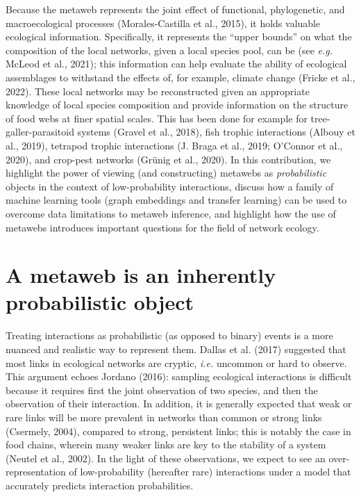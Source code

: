 \documentclass[11pt]{article}
\begin{document}
Because the metaweb represents the joint effect of functional,
phylogenetic, and macroecological processes (Morales-Castilla et al.,
2015), it holds valuable ecological information. Specifically, it
represents the ``upper bounds'' on what the composition of the local
networks, given a local species pool, can be (see \emph{e.g.} McLeod et
al., 2021); this information can help evaluate the ability of ecological
assemblages to withstand the effects of, for example, climate change
(Fricke et al., 2022). These local networks may be reconstructed given
an appropriate knowledge of local species composition and provide
information on the structure of food webs at finer spatial scales. This
has been done for example for tree-galler-parasitoid systems (Gravel et
al., 2018), fish trophic interactions (Albouy et al., 2019), tetrapod
trophic interactions (J. Braga et al., 2019; O'Connor et al., 2020), and
crop-pest networks (Grünig et al., 2020). In this contribution, we
highlight the power of viewing (and constructing) metawebs as
\emph{probabilistic} objects in the context of low-probability
interactions, discuss how a family of machine learning tools (graph
embeddings and transfer learning) can be used to overcome data
limitations to metaweb inference, and highlight how the use of metawebs
introduces important questions for the field of network ecology.

\hypertarget{a-metaweb-is-an-inherently-probabilistic-object}{%
\section{A metaweb is an inherently probabilistic
object}\label{a-metaweb-is-an-inherently-probabilistic-object}}

Treating interactions as probabilistic (as opposed to binary) events is
a more nuanced and realistic way to represent them. Dallas et al. (2017)
suggested that most links in ecological networks are cryptic,
\emph{i.e.} uncommon or hard to observe. This argument echoes Jordano
(2016): sampling ecological interactions is difficult because it
requires first the joint observation of two species, and then the
observation of their interaction. In addition, it is generally expected
that weak or rare links will be more prevalent in networks than common
or strong links (Csermely, 2004), compared to strong, persistent links;
this is notably the case in food chains, wherein many weaker links are
key to the stability of a system (Neutel et al., 2002). In the light of
these observations, we expect to see an over-representation of
low-probability (hereafter rare) interactions under a model that
accurately predicts interaction probabilities.
\end{document}
